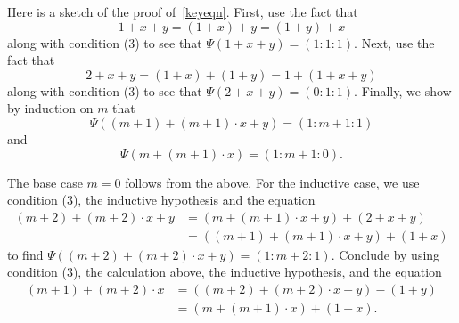 \documentclass[12pt]{amsart}
\begin{document}
Here is a sketch of the proof of~\eqref{keyeqn}.
First, use the fact that
\[ 1+x+y = (1+x) + y = (1+y) + x \]
along with condition (3) to see that $\Psi(1+x+y) = (1:1:1)$.
Next, use the fact that
\[ 2+x+y = (1+x) + (1+y) = 1+(1+x+y) \]
along with condition (3) to see that $\Psi(2+x+y) = (0:1:1)$.
Finally, we show by induction on $m$ that
\[ \Psi((m+1)+(m+1) \cdot x + y) = (1:m+1:1) \]
and
\[ \Psi(m+(m+1) \cdot x) = (1:m+1:0). \]

The base case $m = 0$ follows from the above.
For the inductive case, we use condition (3), the inductive hypothesis and the equation
\begin{align*}
  (m+2)+(m+2) \cdot x + y &= (m+(m+1) \cdot x + y)+(2+x+y)  \\
                          &= ((m+1)+(m+1) \cdot x + y) + (1+x)
\end{align*}
to find $\Psi((m+2)+(m+2) \cdot x + y) = (1:m+2:1)$.
Conclude by using condition (3), the calculation above, the inductive hypothesis, and the equation
\begin{align*}
  (m+1) + (m+2) \cdot x &= ((m+2)+(m+2) \cdot x + y) - (1+y) \\
                        &= (m + (m+1) \cdot x) + (1 + x).
\end{align*}



\end{document}
